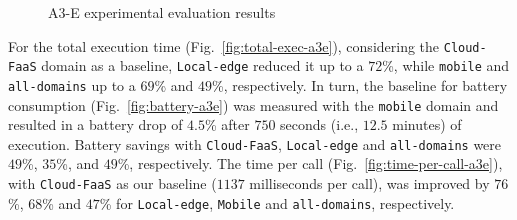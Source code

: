 \begin{figure}[htb]
	\centering
	\captionsetup[subfigure]{width=0.32\textwidth}	
		\captionsetup[subfigure]{width=0.32\textwidth}
	\captionsetup[subfigure]{width=0.32\textwidth}	
	\setlength{\belowcaptionskip}{-10pt}	
	\caption{A3-E experimental evaluation results} \label{fig:exp-a3e}
\end{figure}


For the total execution time (Fig.~\ref{fig:total-exec-a3e}), considering the \texttt{Cloud-FaaS} domain as a baseline, \texttt{Local-edge} reduced it up to a $72$\%, while \texttt{mobile} and \texttt{all-domains} up to a $69$\% and $49$\%, respectively. In turn, the baseline for battery consumption (Fig.~\ref{fig:battery-a3e}) was measured with the \texttt{mobile} domain and resulted in a battery drop of $4.5$\% after $750$ seconds (i.e., $12.5$ minutes) of execution. Battery savings with \texttt{Cloud-FaaS}, \texttt{Local-edge} and \texttt{all-domains} were $49$\%, $35$\%, and $49$\%, respectively. The time per call (Fig.~\ref{fig:time-per-call-a3e}), with \texttt{Cloud-FaaS} as our baseline ($1137$ milliseconds per call), was improved by $76$\%, $68$\% and $47$\% for \texttt{Local-edge}, \texttt{Mobile} and \texttt{all-domains}, respectively. 

